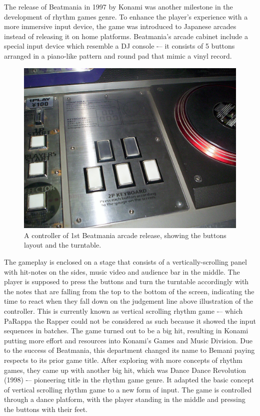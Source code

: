 The release of Beatmania in 1997 by Konami was another milestone in the development of rhythm games genre. To enhance the player's experience with a more immersive input device, the game was introduced to Japanese arcades instead of releasing it on home platforms. Beatmania's arcade cabinet include a special input device which resemble a DJ console -– it consists of 5 buttons arranged in a piano-like pattern and round pad that mimic a vinyl record. 

\begin{figure}[h]
    \centering\includegraphics[scale=0.25]{obrazki/beatmaniacontrols.jpg}
    \caption{A controller of 1st Beatmania arcade release, showing the buttons layout and the turntable. \cite{beatmaniacontrols}}
    \label{fig:beatmania_controls}
\end{figure}

The gameplay is enclosed on a stage that consists of a vertically-scrolling panel with hit-notes on the sides, music video and audience bar in the middle. The player is supposed to press the buttons and turn the turntable accordingly with the notes that are falling from the top to the bottom of the screen, indicating the time to react when they fall down on the judgement line above illustration of the controller. This is currently known as vertical scrolling rhythm game -– which PaRappa the Rapper could not be considered as such because it showed the input sequences in batches. The game turned out to be a big hit, resulting in Konami putting more effort and resources into Konami's Games and Music Division. Due to the success of Beatmania, this department changed its name to Bemani paying respects to its prior game title. \cite{musicbasedgames} After exploring with more concepts of rhythm games, they came up with another big hit, which was Dance Dance Revolution (1998) -– pioneering title in the rhythm game genre. It adapted the basic concept of vertical scrolling rhythm game to a new form of input. The game is controlled through a dance platform, with the player standing in the middle and pressing the buttons with their feet.

